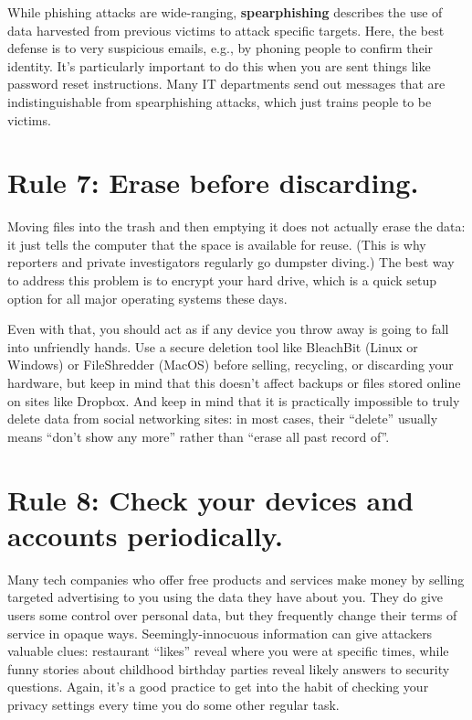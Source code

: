 \documentclass[10pt,letterpaper]{article}
\begin{document}
While phishing attacks are wide-ranging, \textbf{spearphishing} describes the
use of data harvested from previous victims to attack specific targets. Here,
the best defense is to very suspicious emails, e.g., by phoning people to
confirm their identity. It's particularly important to do this when you are sent
things like password reset instructions. Many IT departments send out messages
that are indistinguishable from spearphishing attacks, which just trains people
to be victims.

\section*{Rule 7: Erase before discarding.}

Moving files into the trash and then emptying it does not actually erase the
data: it just tells the computer that the space is available for reuse. (This is
why reporters and private investigators regularly go dumpster diving.) The best
way to address this problem is to encrypt your hard drive, which is a quick
setup option for all major operating systems these days.

Even with that, you should act as if any device you throw away is going to fall
into unfriendly hands. Use a secure deletion tool like BleachBit (Linux or
Windows) or FileShredder (MacOS) before selling, recycling, or discarding your
hardware, but keep in mind that this doesn't affect backups or files stored
online on sites like Dropbox. And keep in mind that it is practically impossible
to truly delete data from social networking sites: in most cases, their
``delete'' usually means ``don't show any more'' rather than ``erase all past
record of''.

\section*{Rule 8: Check your devices and accounts periodically.}

Many tech companies who offer free products and services make money by selling
targeted advertising to you using the data they have about you.  They do give
users some control over personal data, but they frequently change their terms of
service in opaque ways. Seemingly-innocuous information can give attackers
valuable clues: restaurant ``likes'' reveal where you were at specific times,
while funny stories about childhood birthday parties reveal likely answers to
security questions. Again, it's a good practice to get into the habit of
checking your privacy settings every time you do some other regular task.
\end{document}

